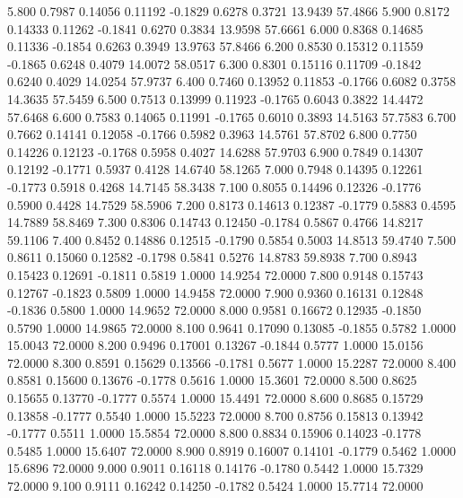    5.800   0.7987   0.14056   0.11192  -0.1829   0.6278   0.3721  13.9439  57.4866
   5.900   0.8172   0.14333   0.11262  -0.1841   0.6270   0.3834  13.9598  57.6661
   6.000   0.8368   0.14685   0.11336  -0.1854   0.6263   0.3949  13.9763  57.8466
   6.200   0.8530   0.15312   0.11559  -0.1865   0.6248   0.4079  14.0072  58.0517
   6.300   0.8301   0.15116   0.11709  -0.1842   0.6240   0.4029  14.0254  57.9737
   6.400   0.7460   0.13952   0.11853  -0.1766   0.6082   0.3758  14.3635  57.5459
   6.500   0.7513   0.13999   0.11923  -0.1765   0.6043   0.3822  14.4472  57.6468
   6.600   0.7583   0.14065   0.11991  -0.1765   0.6010   0.3893  14.5163  57.7583
   6.700   0.7662   0.14141   0.12058  -0.1766   0.5982   0.3963  14.5761  57.8702
   6.800   0.7750   0.14226   0.12123  -0.1768   0.5958   0.4027  14.6288  57.9703
   6.900   0.7849   0.14307   0.12192  -0.1771   0.5937   0.4128  14.6740  58.1265
   7.000   0.7948   0.14395   0.12261  -0.1773   0.5918   0.4268  14.7145  58.3438
   7.100   0.8055   0.14496   0.12326  -0.1776   0.5900   0.4428  14.7529  58.5906
   7.200   0.8173   0.14613   0.12387  -0.1779   0.5883   0.4595  14.7889  58.8469
   7.300   0.8306   0.14743   0.12450  -0.1784   0.5867   0.4766  14.8217  59.1106
   7.400   0.8452   0.14886   0.12515  -0.1790   0.5854   0.5003  14.8513  59.4740
   7.500   0.8611   0.15060   0.12582  -0.1798   0.5841   0.5276  14.8783  59.8938
   7.700   0.8943   0.15423   0.12691  -0.1811   0.5819   1.0000  14.9254  72.0000
   7.800   0.9148   0.15743   0.12767  -0.1823   0.5809   1.0000  14.9458  72.0000
   7.900   0.9360   0.16131   0.12848  -0.1836   0.5800   1.0000  14.9652  72.0000
   8.000   0.9581   0.16672   0.12935  -0.1850   0.5790   1.0000  14.9865  72.0000
   8.100   0.9641   0.17090   0.13085  -0.1855   0.5782   1.0000  15.0043  72.0000
   8.200   0.9496   0.17001   0.13267  -0.1844   0.5777   1.0000  15.0156  72.0000
   8.300   0.8591   0.15629   0.13566  -0.1781   0.5677   1.0000  15.2287  72.0000
   8.400   0.8581   0.15600   0.13676  -0.1778   0.5616   1.0000  15.3601  72.0000
   8.500   0.8625   0.15655   0.13770  -0.1777   0.5574   1.0000  15.4491  72.0000
   8.600   0.8685   0.15729   0.13858  -0.1777   0.5540   1.0000  15.5223  72.0000
   8.700   0.8756   0.15813   0.13942  -0.1777   0.5511   1.0000  15.5854  72.0000
   8.800   0.8834   0.15906   0.14023  -0.1778   0.5485   1.0000  15.6407  72.0000
   8.900   0.8919   0.16007   0.14101  -0.1779   0.5462   1.0000  15.6896  72.0000
   9.000   0.9011   0.16118   0.14176  -0.1780   0.5442   1.0000  15.7329  72.0000
   9.100   0.9111   0.16242   0.14250  -0.1782   0.5424   1.0000  15.7714  72.0000
